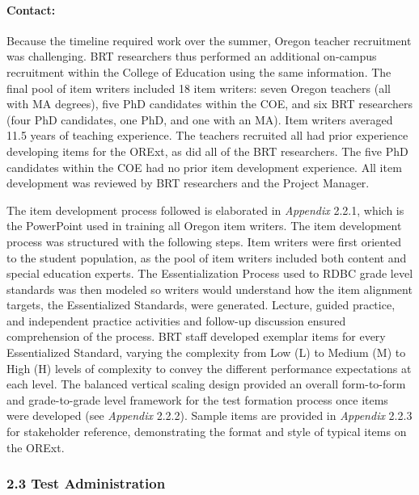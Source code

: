 \documentclass[]{article}
\let\oldparagraph\paragraph
\renewcommand{\paragraph}[1]{\oldparagraph{#1}\mbox{}}
\begin{document}
\paragraph{Contact:}\label{contact}

Because the timeline required work over the summer, Oregon teacher
recruitment was challenging. BRT researchers thus performed an
additional on-campus recruitment within the College of Education using
the same information. The final pool of item writers included 18 item
writers: seven Oregon teachers (all with MA degrees), five PhD
candidates within the COE, and six BRT researchers (four PhD candidates,
one PhD, and one with an MA). Item writers averaged 11.5 years of
teaching experience. The teachers recruited all had prior experience
developing items for the ORExt, as did all of the BRT researchers. The
five PhD candidates within the COE had no prior item development
experience. All item development was reviewed by BRT researchers and the
Project Manager.

The item development process followed is elaborated in \emph{Appendix}
2.2.1, which is the PowerPoint used in training all Oregon item writers.
The item development process was structured with the following steps.
Item writers were first oriented to the student population, as the pool
of item writers included both content and special education experts. The
Essentialization Process used to RDBC grade level standards was then
modeled so writers would understand how the item alignment targets, the
Essentialized Standards, were generated. Lecture, guided practice, and
independent practice activities and follow-up discussion ensured
comprehension of the process. BRT staff developed exemplar items for
every Essentialized Standard, varying the complexity from Low (L) to
Medium (M) to High (H) levels of complexity to convey the different
performance expectations at each level. The balanced vertical scaling
design provided an overall form-to-form and grade-to-grade level
framework for the test formation process once items were developed (see
\emph{Appendix} 2.2.2). Sample items are provided in \emph{Appendix}
2.2.3 for stakeholder reference, demonstrating the format and style of
typical items on the ORExt.

\subsubsection{2.3 Test Administration}\label{test-administration}
\end{document}

